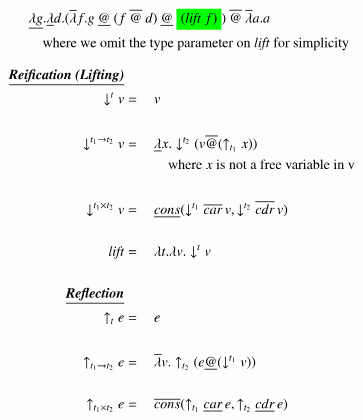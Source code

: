 \documentclass[a4paper,12pt,twoside,openright]{report}
\theoremstyle{definition}
\begin{document}
\begin{figure}[h]
    \begin{align}
        & \underline{\lambda g}.\underline{\lambda} d.(\overline{\lambda}f.g \: \underline{@} \: (f \: \overline{@} \: d) \: \underline{@} \: \text{\colorbox{green}{(\textit{lift} $f$)}}) \: \overline{@} \: \overline{\lambda} a.a \label{eq:tdpe_ex4} \\
        & \quad \text{where we omit the type parameter on \textit{lift} for simplicity} \nonumber
    \end{align}
\end{figure}


\newpage
\begin{figure}[htp!]
    \centering
    \begin{alignat}{2}
        \text{\underline{\textbf{\emph{Reification (Lifting)}}}}\nonumber \\
        \downarrow^{t} v & = \: && v \\
        \nonumber \\%
        \downarrow^{t_{1} \rightarrow t_{2}} v & = \: && \underline{\lambda} x.\downarrow^{t_{2}}(v\overline{@}(\uparrow_{t_{1}} x)) \\
        & && \quad\text{where $x$ is not a free variable in v} \nonumber \\
        \nonumber \\%
        \downarrow^{t_{1} \times t_{2}} v & = \: && \underline{cons}(\downarrow^{t_{1}} \overline{car} \, v, \downarrow^{t_{2}} \overline{cdr} \, v) \\
        \nonumber \\%
        \mathit{lift} & = \: && \lambda t. \lambda v. \downarrow^{t} v \\
        \nonumber \\%
        \text{\underline{\textbf{\emph{Reflection}}}}\nonumber \\
        \uparrow_{t} e & = \: && e \\
        \nonumber \\%
        \uparrow_{t_{1} \rightarrow t_{2}} e & = \: && \overline{\lambda} v.\uparrow_{t_{2}}(e\underline{@}(\downarrow^{t_{1}} v)) \\
        \nonumber \\%
        \uparrow_{t_{1} \times t_{2}} e & = \: && \overline{cons}(\uparrow_{t_{1}} \underline{car} \, e, \uparrow_{t_{2}} \underline{cdr} \, e) \\

\end{alignat}
\end{figure}
\end{document}
